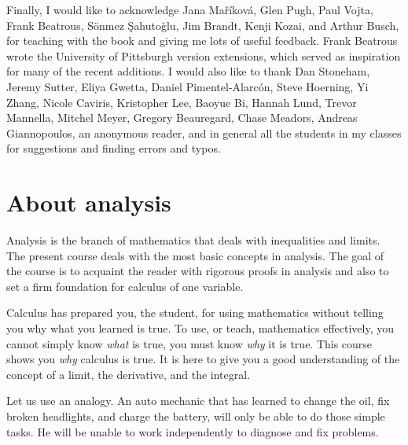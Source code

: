\documentclass[12pt]{book}
\begin{document}
\medskip

Finally, I would like to acknowledge 
Jana Ma\v{r}\'ikov\'a,
Glen Pugh, Paul Vojta, 
Frank Beatrous, 
S\"{o}nmez \c{S}ahuto\u{g}lu,
Jim Brandt, 
Kenji Kozai, 
and Arthur Busch,
for teaching with the book and giving me lots of useful feedback.
Frank Beatrous wrote the University of Pittsburgh version extensions, which served as inspiration for many of the recent additions.
I would also like to thank
Dan Stoneham, 
Jeremy Sutter, 
Eliya Gwetta, 
Daniel Pimentel-Alarc\'on,
Steve Hoerning, 
Yi Zhang, 
Nicole Caviris,
Kristopher Lee, 
Baoyue Bi, 
Hannah Lund,
Trevor Mannella, 
Mitchel Meyer, 
Gregory Beauregard,
Chase Meadors, 
Andreas Giannopoulos,
an anonymous reader, and in general all the students in my classes for suggestions and
finding errors and typos.


\sectionnewpage
\section{About analysis} \label{sec:aboutra}

Analysis is the branch of mathematics that deals with inequalities and limits.  
The present course deals with the most basic  concepts in analysis.  
The goal of the course is to acquaint the reader with rigorous proofs in analysis and also to set a firm foundation for calculus of one variable.

Calculus has prepared you, the student, for using mathematics without telling you why what you learned is true.  
To use, or teach, mathematics effectively, you cannot simply know \emph{what} is true, you must know \emph{why} it is true.  
This course shows you \emph{why} calculus is true.  
It is here to give you a good understanding of the concept of a limit, the derivative, and the integral.

Let us use an analogy.
An auto mechanic that has learned to change the oil, fix broken headlights, and charge the battery, will only be able to do those simple tasks.  
He will be unable to work independently to diagnose and fix problems.
\end{document}
